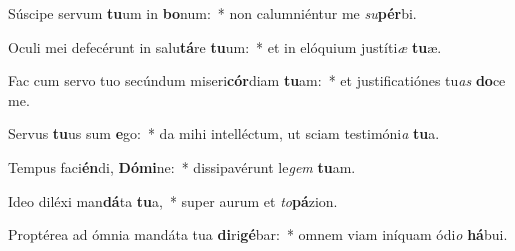 \item Súscipe servum \textbf{tu}um in \textbf{bo}num:~* non calumniéntur me \textit{su}\textbf{pér}bi.
\item Oculi mei defecérunt in salu\textbf{tá}re \textbf{tu}um:~* et in elóquium justíti\textit{æ} \textbf{tu}æ.
\item Fac cum servo tuo secúndum miseri\textbf{cór}diam \textbf{tu}am:~* et justificatiónes tu\textit{as} \textbf{do}ce me.
\item Servus \textbf{tu}us sum \textbf{e}go:~* da mihi intelléctum, ut sciam testimóni\textit{a} \textbf{tu}a.
\item Tempus faci\textbf{én}di, \textbf{Dó}\textbf{mi}ne:~* dissipavérunt le\textit{gem} \textbf{tu}am.
\item Ideo diléxi man\textbf{dá}ta \textbf{tu}a,~* super aurum et \textit{to}\textbf{pá}zion.
\item Proptérea ad ómnia mandáta tua \textbf{di}ri\textbf{gé}bar:~* omnem viam iníquam ódi\textit{o} \textbf{há}bui.
